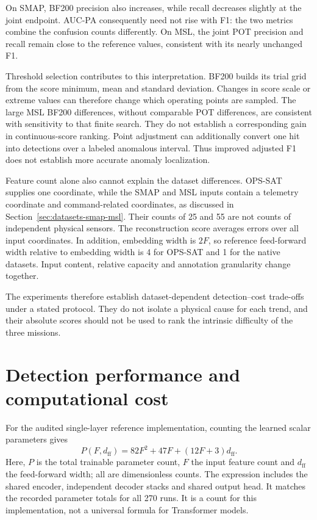 On \ac{SMAP}, BF200 precision also increases, while recall decreases
slightly at the joint endpoint. AUC-PA consequently need not rise with
F1: the two metrics combine the confusion counts differently. On
\ac{MSL}, the joint \ac{POT} precision and recall remain close to the
reference values, consistent with its nearly unchanged F1.

Threshold selection contributes to this interpretation. BF200 builds
its trial grid from the score minimum, mean and standard deviation.
Changes in score scale or extreme values can therefore change which
operating points are sampled. The large \ac{MSL} BF200 differences,
without comparable \ac{POT} differences, are consistent with sensitivity
to that finite search. They do not establish a corresponding gain in
continuous-score ranking. Point adjustment can additionally convert one
hit into detections over a labeled anomalous interval. Thus improved
adjusted F1 does not establish more accurate anomaly localization.

Feature count alone also cannot explain the dataset differences.
\ac{OPS-SAT} supplies one coordinate, while the \ac{SMAP} and
\ac{MSL} inputs contain a telemetry coordinate and command-related
coordinates, as discussed in Section~\ref{sec:datasets-smap-msl}.
Their counts of \num{25} and \num{55} are not counts of independent
physical sensors. The reconstruction score averages errors over all
input coordinates. In addition, embedding width is \(2F\), so reference
feed-forward width relative to embedding width is \num{4} for
\ac{OPS-SAT} and \num{1} for the native datasets. Input content,
relative capacity and annotation granularity change together.

The experiments therefore establish dataset-dependent detection--cost
trade-offs under a stated protocol. They do not isolate a physical
cause for each trend, and their absolute scores should not be used to
rank the intrinsic difficulty of the three missions.

\section{Detection performance and computational cost}
\label{sec:ablation-tradeoffs}
For the audited single-layer reference implementation, counting the
learned scalar parameters gives
\begin{equation}
  P(F,d_{\mathrm{ff}})=82F^2+47F+(12F+3)d_{\mathrm{ff}}.
  \label{eq:ablation-parameters}
\end{equation}
Here, \(P\) is the total trainable parameter count, \(F\) the input
feature count and \(d_{\mathrm{ff}}\) the feed-forward width; all are
dimensionless counts. The expression includes the shared encoder,
independent decoder stacks and shared output head. It matches the recorded
parameter totals for all \num{270} runs. It is a count for this
implementation, not a universal formula for Transformer models.

